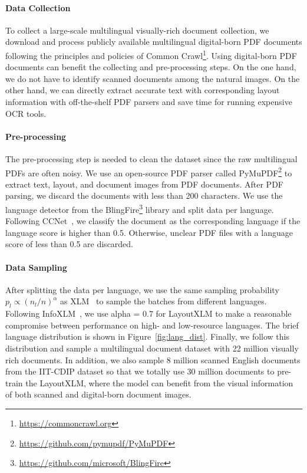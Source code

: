 \documentclass[11pt]{article}
\begin{document}
\paragraph{Data Collection}


To collect a large-scale multilingual visually-rich document collection, we download and process publicly available multilingual digital-born PDF documents following the principles and policies of Common Crawl\footnote{\url{https://commoncrawl.org}}. Using digital-born PDF documents can benefit the collecting and pre-processing steps. On the one hand, we do not have to identify scanned documents among the natural images. On the other hand, we can directly extract accurate text with corresponding layout information with off-the-shelf PDF parsers and save time for running expensive OCR tools. \paragraph{Pre-processing}
The pre-processing step is needed to clean the dataset since the raw multilingual PDFs are often noisy. We use an open-source PDF parser called PyMuPDF\footnote{\url{https://github.com/pymupdf/PyMuPDF}} to extract text, layout, and document images from PDF documents. After PDF parsing, we discard the documents with less than 200 characters. We use the language detector from the BlingFire\footnote{\url{https://github.com/microsoft/BlingFire}} library and split data per language. Following CCNet~\citep{DBLP:journals/corr/abs-1911-00359}, we classify the document as the corresponding language if the language score is higher than 0.5. Otherwise, unclear PDF files with a language score of less than 0.5 are discarded.

\paragraph{Data Sampling}
After splitting the data per language, we use the same sampling probability $p_l \propto (n_l/n)^{\alpha}$ as XLM~\cite{lample2019crosslingual} to sample the batches from different languages. Following InfoXLM~\citep{chi2020infoxlm}, we use alpha = 0.7 for LayoutXLM to make a reasonable compromise between performance on high- and low-resource languages. The brief language distribution is shown in Figure~\ref{fig:lang_dist}. Finally, we follow this distribution and sample a multilingual document dataset with 22 million visually rich documents. In addition, we also sample 8 million scanned English documents from the IIT-CDIP dataset so that we totally use 30 million documents to pre-train the LayoutXLM, where the model can benefit from the visual information of both scanned and digital-born document images.
\end{document}
